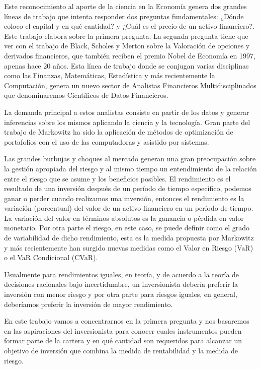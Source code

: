 \documentclass[
  12pt,
]{krantz}
\begin{document}
Este reconocimiento al aporte de la ciencia en la Economía genera dos grandes líneas de trabajo que intenta responder dos preguntas fundamentales: ¿Dónde coloco el capital y en qué cantidad? y ¿Cuál es el precio de un activo financiero?. Este trabajo elabora sobre la primera pregunta. La segunda pregunta tiene que ver con el trabajo de Black, Scholes y Merton sobre la Valoración de opciones y derivados financieros, que también reciben el premio Nobel de Economía en 1997, apenas hace 20 años. Esta línea de trabajo donde se conjugan varias disciplinas como las Finanzas, Matemáticas, Estadística y más recientemente la Computación, genera un nuevo sector de Analistas Financieros Multidisciplinados que denominaremos Científicos de Datos Financieros.

La demanda principal a estos analistas consiste en partir de los datos y generar inferencias sobre los mismos aplicando la ciencia y la tecnología. Gran parte del trabajo de Markowitz ha sido la aplicación de métodos de optimización de portafolios con el uso de las computadoras y asistido por sistemas.

Las grandes burbujas y choques al mercado generan una gran preocupación sobre la gestión apropiada del riesgo y al mismo tiempo un entendimiento de la relación entre el riesgo que se asume y los beneficios posibles. El rendimiento es el resultado de una inversión después de un período de tiempo específico, podemos ganar o perder cuando realizamos una inversión, entonces el rendimiento es la variación (porcentual) del valor de un activo financiero en un período de tiempo. La variación del valor en términos absolutos es la ganancia o pérdida en valor monetario. Por otra parte el riesgo, en este caso, se puede definir como el grado de variabilidad de dicho rendimiento, esta es la medida propuesta por Markowitz y más recientemente han surgido nuevas medidas como el Valor en Riesgo (VaR) o el VaR Condicional (CVaR).

Usualmente para rendimientos iguales, en teoría, y de acuerdo a la teoría de decisiones racionales bajo incertidumbre, un inversionista debería preferir la inversión con menor riesgo y por otra parte para riesgos iguales, en general, deberíamos preferir la inversión de mayor rendimiento.

En este trabajo vamos a concentrarnos en la primera pregunta y nos basaremos en las aspiraciones del inversionista para conocer cuales instrumentos pueden formar parte de la cartera y en qué cantidad son requeridos para alcanzar un objetivo de inversión que combina la medida de rentabilidad y la medida de riesgo.
\end{document}
